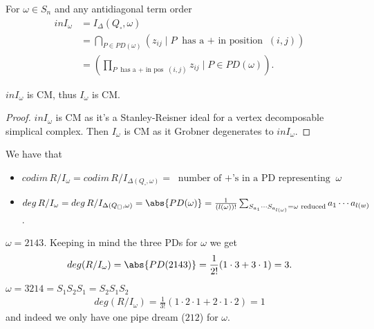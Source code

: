 \begin{theorem}
    For $\omega \in S_n$ and any antidiagonal term order
    \begin{align*}
        in I_\omega &= I_\Delta (Q_\square, \omega)\\
        &= \bigcap_{P \in PD(\omega)} ( z_{ij} \mid P \text{ has a $+$ in position } (i,j) )\\
        &= ( \prod_{P \text{ has a $+$ in pos } (i,j)} z_{ij} \mid P \in PD(\omega) ).
    \end{align*}
\end{theorem}

\begin{corollary}
    $in I_\omega $ is CM, thus $I_\omega$ is CM.
\end{corollary}

\begin{proof}
    $in  I_\omega$ is CM as it's a Stanley-Reisner ideal for a vertex decomposable simplical complex. Then $I_\omega$ is CM as it Grobner degenerates to $in I_\omega$.
\end{proof}

\begin{corollary}
    We have that
    \begin{itemize}
        \item $codim\, R/ I_\omega = codim\, R/ I_{\Delta (Q_\square, \omega )} = \text{ number of $+$'s in a PD representing } \omega$
        \item $deg \,R / I_\omega  = deg \, R/ I_{\Delta (Q_\square , \omega) } = \abs{ PD(\omega)} = \frac{1}{(l(\omega ))!} \sum_{S_{a_{1}} \cdots S_{a_{l(\omega)} } = \omega \text{ reduced} } a_1 \cdots a_{l(w)} $.
    \end{itemize}
\end{corollary}

\begin{example}
    $\omega = 2143$. Keeping in mind the three PDs for $\omega$ we get
    \begin{align*}
        deg( R/ I_\omega ) = \abs{ PD(2143) } = \frac{1}{2!} ( 1 \cdot 3 + 3 \cdot 1 ) = 3.
    \end{align*}
\end{example}

\begin{example}
    $\omega = 3214 = S_1 S_2 S_1 = S_2 S_1 S_2$
    \begin{align*}
        deg( R/ I_\omega ) = \frac{1}{3!} (1 \cdot 2 \cdot 1 + 2 \cdot 1 \cdot 2 ) = 1
    \end{align*}
    and indeed we only have one pipe dream ($212$) for $\omega$.
\end{example}


